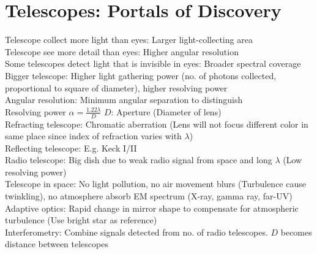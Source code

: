 \documentclass{article}
\begin{document}
\section{Telescopes: Portals of Discovery}
Telescope collect more light than eyes: Larger light-collecting area\\
Telescope see more detail than eyes: Higher angular resolution\\
Some telescopes detect light that is invisible in eyes: Broader spectral coverage\\
Bigger telescope: Higher light gathering power (no. of photons collected, proportional to square of diameter), higher resolving power\\
Angular resolution: Minimum angular separation to distinguish\\
Resolving power $\alpha=\frac{1.22\lambda}{D}$ \quad $D$: Aperture (Diameter of lens)\\
Refracting telescope: Chromatic aberration (Lens will not focus different color in same place since index of refraction varies with $\lambda$)\\
Reflecting telescope: E.g. Keck I/II\\
Radio telescope: Big dish due to weak radio signal from space and long $\lambda$ (Low resolving power)\\
Telescope in space: No light pollution, no air movement blurs (Turbulence cause twinkling), no atmosphere absorb EM spectrum (X-ray, gamma ray, far-UV)\\
Adaptive optics: Rapid change in mirror shape to compensate for atmospheric turbulence (Use bright star as reference)\\
Interferometry: Combine signals detected from no. of radio telescopes. $D$ becomes distance between telescopes
\end{document}
